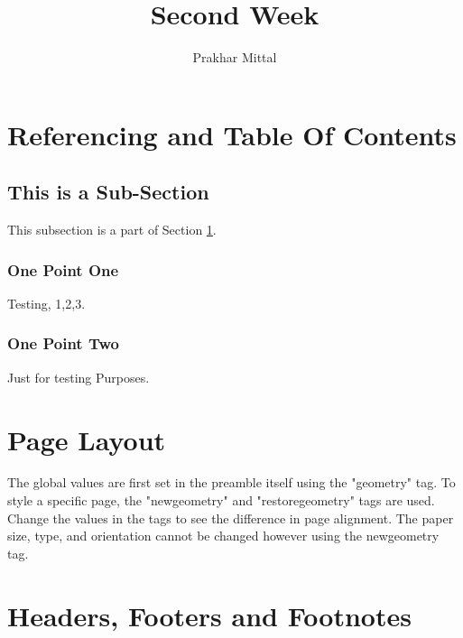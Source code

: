 \documentclass[12pt letterpaper]{article}
\title{Second Week}
\author{Prakhar Mittal}
\begin{document}
\maketitle
\tableofcontents
\thispagestyle{empty} %

\clearpage
{} %

\section{Referencing and Table Of Contents}
\label{first}
    \subsection{This is a Sub-Section}
    \label{subsection}
    This subsection is a part of Section \ref{first}.
        \subsubsection{One Point One}
        \label {1.1}
        Testing, 1,2,3.
        
        {\setcounter{tocdepth}{3}}

        \subsubsection{One Point Two}
        \label{1.2}
        Just for testing Purposes.

{\setcounter{tocdepth}{2}}

\section{Page Layout}
The global values are first set in the preamble itself using the "geometry" tag. 
To style a specific page, the "newgeometry" and "restoregeometry" tags are used. 
Change the values in the tags to see the difference in page alignment. 
The paper size, type, and orientation cannot be changed however using the newgeometry tag.

\restoregeometry %

\section{Headers, Footers and Footnotes}
\end{document}
